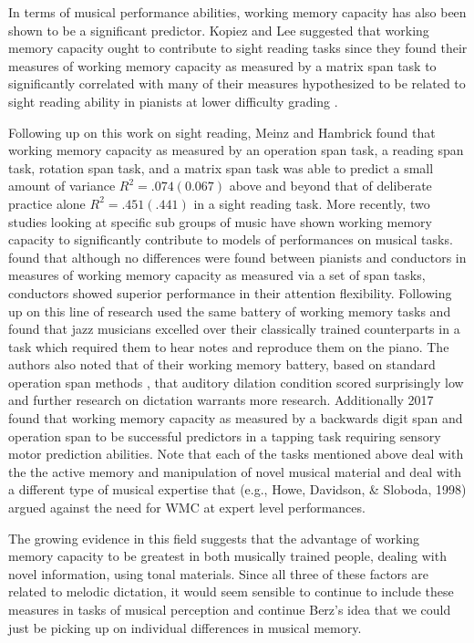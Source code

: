 \documentclass[]{book}
\theoremstyle{definition}
\theoremstyle{definition}
\theoremstyle{definition}
\theoremstyle{remark}
\begin{document}
In terms of musical performance abilities, working memory capacity has
also been shown to be a significant predictor. Kopiez and Lee suggested
that working memory capacity ought to contribute to sight reading tasks
since they found their measures of working memory capacity as measured
by a matrix span task to significantly correlated with many of their
measures hypothesized to be related to sight reading ability in pianists
at lower difficulty grading
\citep{kopiezDynamicModelSkills2006, kopiezGeneralModelSkills2008}.

Following up on this work on sight reading, Meinz and Hambrick found
that working memory capacity as measured by an operation span task, a
reading span task, rotation span task, and a matrix span task was able
to predict a small amount of variance \(R^2=.074(0.067)\) above and
beyond that of deliberate practice alone \(R^2=.451(.441)\) in a sight
reading task. More recently, two studies looking at specific sub groups
of music have shown working memory capacity to significantly contribute
to models of performances on musical tasks.
\citep{wollnerAttentionalFlexibilityMemory2016} found that although no
differences were found between pianists and conductors in measures of
working memory capacity as measured via a set of span tasks, conductors
showed superior performance in their attention flexibility. Following up
on this line of research \citep{nicholsScoreOneJazz2018} used the same
battery of working memory tasks and found that jazz musicians excelled
over their classically trained counterparts in a task which required
them to hear notes and reproduce them on the piano. The authors also
noted that of their working memory battery, based on standard operation
span methods \citep{engleWorkingMemoryCapacity2002}, that auditory
dilation condition scored surprisingly low and further research on
dictation warrants more research. Additionally
\citep{colleyWorkingMemoryAuditory2018} 2017 found that working memory
capacity as measured by a backwards digit span and operation span to be
successful predictors in a tapping task requiring sensory motor
prediction abilities. Note that each of the tasks mentioned above deal
with the the active memory and manipulation of novel musical material
and deal with a different type of musical expertise that (e.g., Howe,
Davidson, \& Sloboda, 1998) argued against the need for WMC at expert
level performances.

The growing evidence in this field suggests that the advantage of
working memory capacity to be greatest in both musically trained people,
dealing with novel information, using tonal materials. Since all three
of these factors are related to melodic dictation, it would seem
sensible to continue to include these measures in tasks of musical
perception and continue Berz's idea that we could just be picking up on
individual differences in musical memory.
\end{document}
